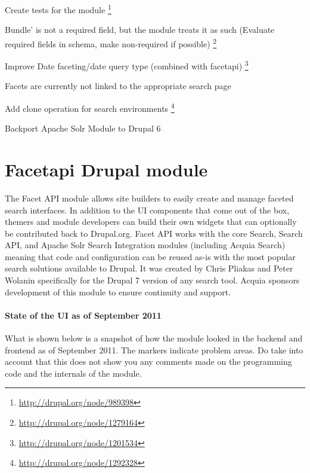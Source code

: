 \begin{packed_itemize}
\item Create tests for the module \footnote{\url{http://drupal.org/node/989398}}
\item Bundle' is not a required field, but the module treats it as such (Evaluate required fields in schema, make non-required if possible) \footnote{\url{http://drupal.org/node/1279164}}
\item Improve Date faceting/date query type (combined with facetapi) \footnote{\url{http://drupal.org/node/1201534}}
\item Facets are currently not linked to the appropriate search page
\item Add clone operation for search environments \footnote{\url{http://drupal.org/node/1292328}}
\item Backport Apache Solr Module to Drupal 6
\end{packed_itemize}

\section{Facetapi Drupal module}
The Facet API module allows site builders to easily create and manage faceted search interfaces. In addition to the UI components that come out of the box, themers and module developers can build their own widgets that can optionally be contributed back to Drupal.org. Facet API works with the core Search, Search API, and Apache Solr Search Integration modules (including Acquia Search) meaning that code and configuration can be reused as-is with the most popular search solutions available to Drupal. It was created by Chris Pliakas and Peter Wolanin specifically for the Drupal 7 version of any search tool. Acquia sponsors development of this module to ensure continuity and support.

\paragraph{State of the UI as of September 2011} What is shown below is a snapshot of how the module looked in the backend and frontend as of September 2011. The markers indicate problem areas. Do take into account that this does not show you any comments made on the programming code and the internals of the module.

